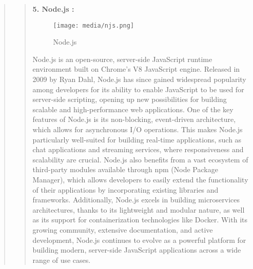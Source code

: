 \documentclass[12pt]{report}
\begin{document}
\begin{quote}
		\begin{quote}
			\textbf{5. Node.js :}\\
			\begin{figure}
				\centering
				\texttt{[image: media/njs.png]}\\
				\caption{Node.js}
			\end{figure}
			Node.js is an open-source, server-side JavaScript runtime environment built on Chrome's V8 JavaScript engine. Released in 2009 by Ryan Dahl, Node.js has since gained widespread popularity among developers for its ability to enable JavaScript to be used for server-side scripting, opening up new possibilities for building scalable and high-performance web applications. One of the key features of Node.js is its non-blocking, event-driven architecture, which allows for asynchronous I/O operations. This makes Node.js particularly well-suited for building real-time applications, such as chat applications and streaming services, where responsiveness and scalability are crucial. Node.js also benefits from a vast ecosystem of third-party modules available through npm (Node Package Manager), which allows developers to easily extend the functionality of their applications by incorporating existing libraries and frameworks. Additionally, Node.js excels in building microservices architectures, thanks to its lightweight and modular nature, as well as its support for containerization technologies like Docker. With its growing community, extensive documentation, and active development, Node.js continues to evolve as a powerful platform for building modern, server-side JavaScript applications across a wide range of use cases.
		\end{quote}
		\clearpage
		

\end{quote}
\end{document}

